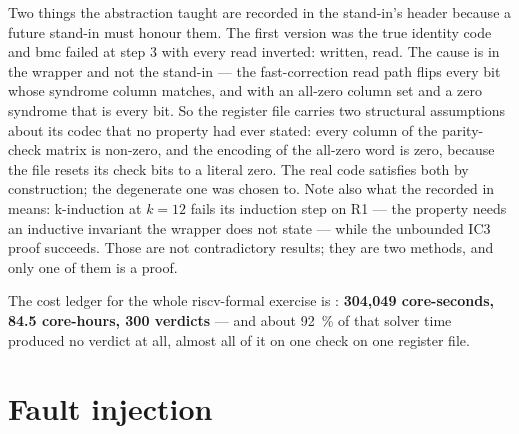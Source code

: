 Two things the abstraction taught are recorded in the stand-in's header
because a future stand-in must honour them. The first version was the
true identity code and bmc failed at step 3 with every read inverted:
 written,  read. The cause is in the
wrapper and not the stand-in --- the fast-correction read path flips
every bit whose syndrome column matches, and with an all-zero column set
and a zero syndrome that is every bit. So the register file carries two
structural assumptions about its codec that no property had ever stated:
every column of the parity-check matrix is non-zero, and the encoding of
the all-zero word is zero, because the file resets its check bits to a
literal zero. The real code satisfies both by construction; the
degenerate one was chosen to. Note also what the recorded
 in  means: k-induction at
$k=12$ fails its induction step on R1 --- the property needs an inductive
invariant the wrapper does not state --- while the unbounded IC3 proof
succeeds. Those are not contradictory results; they are two methods, and
only one of them is a proof.

The cost ledger for the whole riscv-formal exercise is
: \textbf{304,049 core-seconds, 84.5 core-hours,
300 verdicts} --- and about \SI{92}{\percent} of that solver time
produced no verdict at all, almost all of it on one check on one register
file.

\section{Fault injection}
\label{sec:verif-fi}

